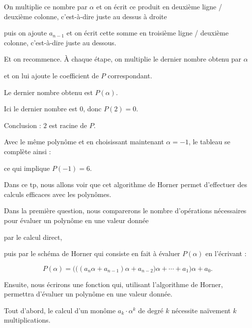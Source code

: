 \change
On multiplie ce nombre par $\alpha$ et on écrit ce produit en deuxième ligne / deuxième colonne, c'est-à-dire juste au dessus à droite 

\change
puis on ajoute $a_{n-1}$ et on écrit cette somme en troisième ligne / deuxième colonne, c'est-à-dire juste au dessous.

\change
Et on recommence. À chaque étape, on multiplie le dernier nombre obtenu par $\alpha$

\change
 et on lui ajoute le coefficient de $P$ correspondant. 
 
\change

\change

\change

\change

\change

\change
Le dernier nombre obtenu est $P(\alpha)$.


Ici le dernier nombre est $0$, donc $P(2)=0$. 

\change
Conclusion : $2$ est racine de $P$.

\change
Avec le même polynôme et en choisissant maintenant $\alpha=-1$, le tableau se complète ainsi :

\change
ce qui implique $P(-1)=6$.



\diapo

Dans ce tp, nous allons voir que cet algorithme de Horner permet d'effectuer des calculs efficaces avec les polynômes.


Dans la première question, nous comparerons le nombre d'opérations nécessaires pour évaluer un polynôme en une valeur donnée 

par le calcul direct, 

puis par le schéma de Horner qui consiste en fait à évaluer $P(\alpha)$ en l'écrivant :

$$P(\alpha) =  \Big(\big((a_n \alpha+a_{n-1})\alpha +a_{n-2} \big) \alpha + \cdots +a_1\Big) \alpha +a_0.$$

Ensuite, nous écrirons une fonction qui, utilisant l'algorithme de Horner, permettra d'évaluer un polynôme en une valeur donnée.

\diapo

Tout d'abord, le calcul d'un monôme $a_k\cdot \alpha^k$ de degré $k$ nécessite naïvement $k$ multiplications.

